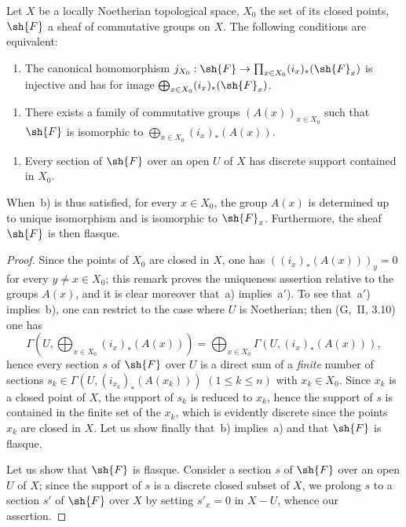 \begin{lemma}[21.9.2]
\label{IV.21.9.2}
Let $X$ be a locally Noetherian topological space, $X_0$ the set of its closed points, $\sh{F}$ a sheaf of commutative groups on $X$.
The following conditions are equivalent:
\begin{enumerate}[label=\emph{\alph*)}]
  \item The canonical homomorphism $j_{X_0}:\sh{F}\to\prod_{x\in X_0}(i_x)_*(\sh{F}_x)$ is injective and has for image $\bigoplus_{x\in X_0}(i_x)_*(\sh{F}_x)$.
\end{enumerate}
\begin{enumerate}[label=\emph{\alph*$'$)}]
  \item There exists a family of commutative groups $(A(x))_{x\in X_0}$ such that $\sh{F}$ is isomorphic to $\bigoplus_{x\in X_0}(i_x)_*(A(x))$.
\end{enumerate}
\begin{enumerate}
  \item[b)] Every section of $\sh{F}$ over an open $U$ of $X$ has discrete support contained in $X_0$.
\end{enumerate}

When~b) is thus satisfied, for every $x\in X_0$, the group $A(x)$ is determined up to unique isomorphism and is isomorphic to $\sh{F}_x$.
Furthermore, the sheaf $\sh{F}$ is then flasque.
\end{lemma}

\begin{proof}
Since the points of $X_0$ are closed in $X$, one has $((i_x)_*(A(x)))_y=0$ for every $y\neq x\in X_0$;
this remark proves the uniqueness assertion relative to the groups $A(x)$, and it is clear moreover that~a) implies~a$'$).
To see that~a$'$) implies~b), one can restrict to the case where $U$ is Noetherian;
then (G,~II, 3.10) one has
\[
  \Gamma(U,\bigoplus_{x\in X_0}(i_x)_*(A(x)))=\bigoplus_{x\in X_0}\Gamma(U,(i_x)_*(A(x))),
\]
hence every section $s$ of $\sh{F}$ over $U$ is a direct sum of a \emph{finite} number of sections $s_k\in\Gamma(U,(i_{x_k})_*(A(x_k)))$ $(1\leq k\leq n)$ with $x_k\in X_0$.
Since $x_k$ is a closed point of $X$, the support of $s_k$ is reduced to $x_k$, hence the support of $s$ is contained in the finite set of the $x_k$, which is evidently discrete since the points $x_k$ are closed in $X$.
Let us show finally that~b) implies~a) and that $\sh{F}$ is flasque.

Let us show that $\sh{F}$ is flasque.
Consider a section $s$ of $\sh{F}$ over an open $U$ of $X$;
since the support of $s$ is a discrete closed subset of $X$, we prolong $s$ to a section $s'$ of $\sh{F}$ over $X$ by setting $s'_x=0$ in $X-U$, whence our assertion.
\end{proof}


